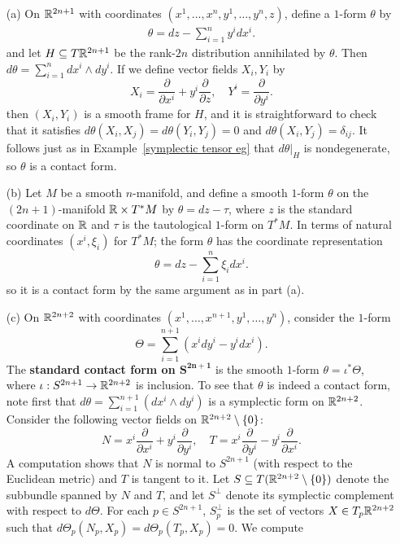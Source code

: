 \begin{example}\label{contact forms eg}
\mbox{}
\begin{itemize}
\item[(a)] On $\mathbb{R}^{2n+1}$ with coordinates $(x^1,\dots,x^n,y^1,\dots,y^n,z)$, define a $1$-form $\theta$ by
\begin{align}\label{contact form standard}
\theta=dz-\sum_{i=1}^{n}y^idx^i.
\end{align}
and let $H\subseteq T\mathbb{R}^{2n+1}$ be the rank-$2n$ distribution annihilated by $\theta$. Then $d\theta=\sum_{i=1}^{n}dx^i\wedge dy^i$. If we define vector fields $X_i,Y_i$ by
\[X_i=\frac{\partial}{\partial x^i}+y^i\frac{\partial}{\partial z},\quad Y^i=\frac{\partial}{\partial y^i}.\]
then $(X_i,Y_i)$ is a smooth frame for $H$, and it is straightforward to check that it satisfies $d\theta(X_i,X_j)=d\theta(Y_i,Y_j)=0$ and $d\theta(X_i,Y_j)=\delta_{ij}$. It follows just as in Example~\ref{symplectic tensor eg} that $d\theta|_H$ is nondegenerate, so $\theta$ is a contact form.
\item[(b)] Let $M$ be a smooth $n$-manifold, and define a smooth $1$-form $\theta$ on the $(2n+1)$-manifold $\mathbb{R}\times T^*M$ by $\theta=dz-\tau$, where $z$ is the standard coordinate on $\mathbb{R}$ and $\tau$ is the tautological $1$-form on $T^*M$. In terms of natural coordinates $(x^i,\xi_i)$ for $T^*M$; the form $\theta$ has the coordinate representation
\[\theta=dz-\sum_{i=1}^{n}\xi_i dx^i.\]
so it is a contact form by the same argument as in part (a).
\item[(c)] On $\mathbb{R}^{2n+2}$ with coordinates $(x^1,\dots,x^{n+1},y^1,\dots,y^n)$, consider the $1$-form
\[\varTheta=\sum_{i=1}^{n+1}(x^idy^i-y^idx^i).\]
The \textbf{standard contact form on $\bm{S^{2n+1}}$} is the smooth $1$-form $\theta=\iota^*\varTheta$, where $\iota:S^{2n+1}\to\mathbb{R}^{2n+2}$ is inclusion. To see that $\theta$ is indeed a contact form, note first that $d\theta=\sum_{i=1}^{n+1}(dx^i\wedge dy^i)$ is a symplectic form on $\mathbb{R}^{2n+2}$. Consider the following vector fields on $\mathbb{R}^{2n+2}\setminus\{0\}$:
\[N=x^i\frac{\partial}{\partial x^i}+y^i\frac{\partial}{\partial y^i},\quad T=x^i\frac{\partial}{\partial y^i}-y^i\frac{\partial}{\partial x^i}.\]
A computation shows that $N$ is normal to $S^{2n+1}$ (with respect to the Euclidean metric) and $T$ is tangent to it. Let $S\subseteq T(\mathbb{R}^{2n+2}\setminus\{0\})$ denote the subbundle spanned by $N$ and $T$, and let $S^\bot$ denote its symplectic complement with respect to $d\varTheta$. For each $p\in S^{2n+1}$, $S^\bot_p$ is the set of vectors $X\in T_p\mathbb{R}^{2n+2}$ such that $d\varTheta_p(N_p,X_p)=d\varTheta_p(T_p,X_p)=0$. We compute

\end{itemize}
\end{example}
